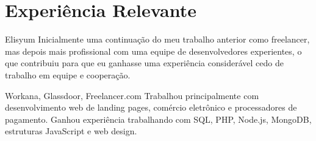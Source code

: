 \section{Experiência Relevante}

\begin{experience}{Elisyum}{
}
Inicialmente uma continuação do meu trabalho anterior como freelancer, mas depois mais profissional com uma equipe de desenvolvedores experientes, o que contribuiu para que eu ganhasse uma experiência considerável cedo de trabalho em equipe e cooperação.

\end{experience}
\begin{experience}[last]{Workana, Glassdoor, Freelancer.com}{
}
Trabalhou principalmente com desenvolvimento web de landing pages, comércio eletrônico e processadores de pagamento. Ganhou experiência trabalhando com SQL, PHP, Node.js, MongoDB, estruturas JavaScript
 e web design.

\end{experience}
